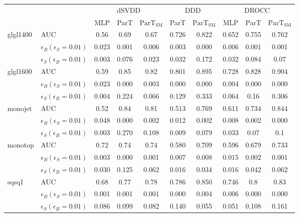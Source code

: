 \begin{table}[H]
    \centering
    \setlength{\tabcolsep}{4pt}
    \begin{tabular}{ll|ccc|cc|ccc}
    \hline
    \multicolumn{2}{c|}{} & \multicolumn{3}{c|}{dSVDD} & \multicolumn{2}{c|}{DDD} & \multicolumn{3}{c}{DROCC} \\
     & & MLP & ParT & $\text{ParT}_{\text{SM}}$ & ParT & $\text{ParT}_{\text{SM}}$ & MLP & ParT & $\text{ParT}_{\text{SM}}$ \\ 
    \hline \hline
    \multirow{3}{*}{glgl1400} & AUC & 0.56 & 0.69 & 0.67 & 0.726 & 0.822 & 0.652 & 0.755 & 0.762 \\
    & $\epsilon_B(\epsilon_S=0.01)$ & 0.023 & 0.001 & 0.006 & 0.003 & 0.000 & 0.006 & 0.001 & 0.001 \\
    & $\epsilon_S(\epsilon_B=0.01)$ & 0.003 & 0.076 & 0.023 & 0.032 & 0.172 & 0.032 & 0.084 & 0.07 \\
    \hline
    \multirow{3}{*}{glgl1600} & AUC & 0.59 & 0.85 & 0.82 & 0.801 & 0.895 & 0.728 & 0.828 & 0.904 \\
    & $\epsilon_B(\epsilon_S=0.01)$ & 0.023 & 0.000 & 0.003 & 0.000 & 0.000 & 0.004 & 0.000 & 0.000 \\
    & $\epsilon_S(\epsilon_B=0.01)$ & 0.004 & 0.224 & 0.066 & 0.129 & 0.333 & 0.064 & 0.16 & 0.306 \\
    \hline 
    \multirow{3}{*}{monojet} & AUC & 0.52 & 0.84 & 0.81 & 0.513 & 0.769 & 0.611 & 0.734 & 0.844 \\
    & $\epsilon_B(\epsilon_S=0.01)$ & 0.048 & 0.000 & 0.002 & 0.012 & 0.002 & 0.008 & 0.002 & 0.000 \\
    & $\epsilon_S(\epsilon_B=0.01)$ & 0.003 & 0.270 & 0.108 & 0.009 & 0.079 & 0.033 & 0.07 & 0.1 \\
    \hline
    \multirow{3}{*}{monotop} & AUC & 0.72 & 0.74 & 0.74 & 0.580 & 0.709 & 0.596 & 0.679 & 0.733 \\
    & $\epsilon_B(\epsilon_S=0.01)$ & 0.003 & 0.000 & 0.001 & 0.007 & 0.008 & 0.015 & 0.002 & 0.001 \\
    & $\epsilon_S(\epsilon_B=0.01)$ & 0.030 & 0.125 & 0.062 & 0.016 & 0.034 & 0.016 & 0.042 & 0.062 \\
    \hline
    \multirow{3}{*}{sqsq1} & AUC & 0.68 & 0.77 & 0.78 & 0.786 & 0.850 & 0.746 & 0.8 & 0.83 \\
    & $\epsilon_B(\epsilon_S=0.01)$ & 0.001 & 0.001 & 0.001 & 0.000 & 0.004 & 0.006 & 0.000 & 0.000 \\
    & $\epsilon_S(\epsilon_B=0.01)$ & 0.086 & 0.099 & 0.082 & 0.140 & 0.055 & 0.051 & 0.108 & 0.161 \\

\end{tabular}
\end{table}
